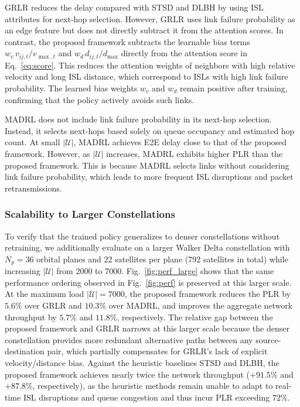 GRLR reduces the delay compared with STSD and DLBH by using ISL attributes for next-hop selection. However, GRLR uses link failure probability as an edge feature but does not directly subtract it from the attention scores. In contrast, the proposed framework subtracts the learnable bias terms $w_v\,v_{ij,t}/v_{\max,t}$ and $w_d\,d_{ij,t}/d_{\max}$ directly from the attention score in Eq.~\eqref{eq:score}. This reduces the attention weights of neighbors with high relative velocity and long ISL distance, which correspond to ISLs with high link failure probability. The learned bias weights $w_v$ and $w_d$ remain positive after training, confirming that the policy actively avoids such links.

MADRL does not include link failure probability in its next-hop selection. Instead, it selects next-hops based solely on queue occupancy and estimated hop count. At small $|\mathcal{U}|$, MADRL achieves E2E delay close to that of the proposed framework. However, as $|\mathcal{U}|$ increases, MADRL exhibits higher PLR than the proposed framework. This is because MADRL selects links without considering link failure probability, which leads to more frequent ISL disruptions and packet retransmissions.

\subsubsection{Scalability to Larger Constellations}

To verify that the trained policy generalizes to denser constellations without retraining, we additionally evaluate on a larger Walker Delta constellation with $N_p = 36$ orbital planes and 22 satellites per plane (792 satellites in total) while increasing $|\mathcal{U}|$ from 2000 to 7000. Fig.~\ref{fig:perf_large} shows that the same performance ordering observed in Fig.~\ref{fig:perf} is preserved at this larger scale. At the maximum load $|\mathcal{U}| = 7000$, the proposed framework reduces the PLR by $5.6\%$ over GRLR and $10.3\%$ over MADRL, and improves the aggregate network throughput by $5.7\%$ and $11.8\%$, respectively. The relative gap between the proposed framework and GRLR narrows at this larger scale because the denser constellation provides more redundant alternative paths between any source-destination pair, which partially compensates for GRLR's lack of explicit velocity/distance bias. Against the heuristic baselines STSD and DLBH, the proposed framework achieves nearly twice the network throughput ($+91.5\%$ and $+87.8\%$, respectively), as the heuristic methods remain unable to adapt to real-time ISL disruptions and queue congestion and thus incur PLR exceeding $72\%$.

